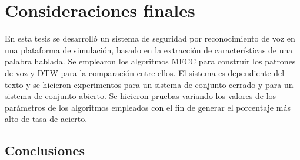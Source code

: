 \chapter{Consideraciones finales}
En esta tesis se desarrolló un sistema de seguridad por reconocimiento de voz en una plataforma de simulación, basado en la extracción de características de una palabra hablada. Se emplearon los algoritmos MFCC para construir los patrones de voz y DTW para la comparación entre ellos. El sistema es dependiente del texto y se hicieron experimentos para un sistema de conjunto cerrado y para un sistema de conjunto abierto. Se hicieron pruebas variando los valores de los parámetros de los algoritmos empleados con el fin de generar el porcentaje más alto de tasa de acierto.

\section{Conclusiones}
